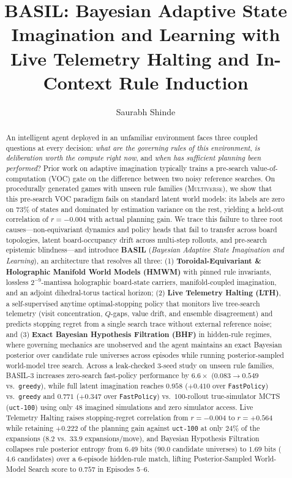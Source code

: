 \documentclass[preprint,3p,times]{elsarticle}
\begin{document}
\begin{frontmatter}

\title{BASIL: Bayesian Adaptive State Imagination and Learning with Live Telemetry Halting and In-Context Rule Induction}

\author{Saurabh Shinde}

\begin{abstract}
An intelligent agent deployed in an unfamiliar environment faces three coupled questions at every decision: \emph{what are the governing rules of this environment}, \emph{is deliberation worth the compute right now}, and \emph{when has sufficient planning been performed}? Prior work on adaptive imagination typically trains a pre-search value-of-computation (VOC) gate on the difference between two noisy reference searches. On procedurally generated games with unseen rule families (\textsc{Multiverse}), we show that this pre-search VOC paradigm fails on standard latent world models: its labels are zero on $73\%$ of states and dominated by estimation variance on the rest, yielding a held-out correlation of $r = -0.004$ with actual planning gain. We trace this failure to three root causes---non-equivariant dynamics and policy heads that fail to transfer across board topologies, latent board-occupancy drift across multi-step rollouts, and pre-search epistemic blindness---and introduce \textbf{BASIL} (\emph{Bayesian Adaptive State Imagination and Learning}), an architecture that resolves all three:
(1) \textbf{Toroidal-Equivariant \& Holographic Manifold World Models (HMWM)} with pinned rule invariants, lossless $2^{-9}$-mantissa holographic board-state carriers, manifold-coupled imagination, and an adjoint dihedral-torus tactical horizon;
(2) \textbf{Live Telemetry Halting (LTH)}, a self-supervised anytime optimal-stopping policy that monitors live tree-search telemetry (visit concentration, $Q$-gaps, value drift, and ensemble disagreement) and predicts stopping regret from a single search trace without external reference noise; and
(3) \textbf{Exact Bayesian Hypothesis Filtration (BHF)} in hidden-rule regimes, where governing mechanics are unobserved and the agent maintains an exact Bayesian posterior over candidate rule universes across episodes while running posterior-sampled world-model tree search.
Across a leak-checked 3-seed study on unseen rule families, BASIL-3 increases zero-search fast-policy performance by $6.6\times$ ($0.083 \to 0.549$ vs.\ \texttt{greedy}), while full latent imagination reaches \textbf{$0.958$} ($+0.410$ over \texttt{FastPolicy}) vs.\ \texttt{greedy} and \textbf{$0.771$} ($+0.347$ over \texttt{FastPolicy}) vs.\ $100$-rollout true-simulator MCTS (\texttt{uct-100}) using only $48$ imagined simulations and zero simulator access. Live Telemetry Halting raises stopping-regret correlation from $r = -0.004$ to $r = +0.564$ while retaining $+0.222$ of the planning gain against \texttt{uct-100} at only $24\%$ of the expansions ($8.2$ vs.\ $33.9$ expansions/move), and Bayesian Hypothesis Filtration collapses rule posterior entropy from $6.49$ bits ($90.0$ candidate universes) to $1.69$ bits ($4.6$ candidates) over a 6-episode hidden-rule match, lifting Posterior-Sampled World-Model Search score to $0.757$ in Episodes 5--6.
\end{abstract}


\end{frontmatter}
\end{document}
